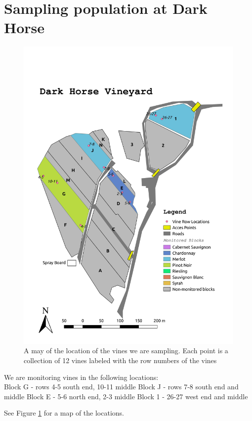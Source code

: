 \documentclass[11pt,letter]{article}
\begin{document}
\section{Sampling population at Dark Horse}
\begin{figure}%
  \includegraphics[width=\linewidth]{DH_map.jpg}
  \caption{A may of the location of the vines we are sampling. Each point is a collection of 12 vines labeled with the row numbers of the vines}
  \label{fig:DH_map}
\end{figure}

We are monitoring vines in the following locations: \\
Block G - rows 4-5 south end, 10-11 middle
Block J - rows 7-8 south end and middle
Block E - 5-6 north end, 2-3 middle
Block 1 - 26-27 west end and middle

See Figure \ref{fig:DH_map} for a map of the locations. \\
\end{document}
